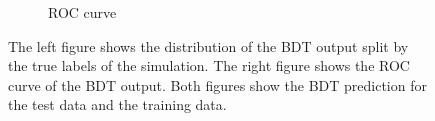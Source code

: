 \begin{figure}
\begin{subfigure}{0.5\textwidth}
        \caption{ROC curve}
        \label{fig:SS_ROC}
    \end{subfigure}%
    \caption{The left figure shows the distribution of the BDT output split by the true labels of the simulation. The right figure shows the ROC curve of the BDT output. Both figures show the BDT prediction for the test data and the training data.}
    \label{fig:SS_eval}
\end{figure}
